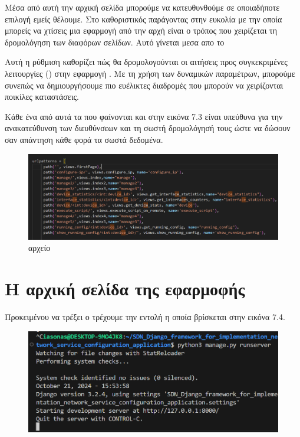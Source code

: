\FloatBarrier

Μέσα από αυτή την αρχική σελίδα μπορούμε να κατευθυνθούμε σε οποιαδήποτε επιλογή εμείς θέλουμε.
Στο  καθοριστικός παράγοντας στην ευκολία με την οποία
μπορείς να χτίσεις μια εφαρμογή από την αρχή είναι ο τρόπος που χειρίζεται
τη δρομολόγηση των διαφόρων σελίδων. Αυτό γίνεται μεσα απο το 

Αυτή η ρύθμιση καθορίζει πώς θα δρομολογούνται οι 
αιτήσεις  προς συγκεκριμένες λειτουργίες () 
στην εφαρμογή . Με τη χρήση των δυναμικών παραμέτρων, 
μπορούμε συνεπώς να δημιουργήσουμε πιο ευέλικτες διαδρομές  
που μπορούν να χειρίζονται ποικίλες καταστάσεις. 

Κάθε ένα από αυτά τα  που φαίνονται και στην εικόνα 7.3
είναι υπεύθυνα για την ανακατεύθυνση των διευθύνσεων και τη σωστή δρομολόγησή
τους ώστε να δώσουν σαν απάντηση κάθε φορά τα σωστά δεδομένα.

\FloatBarrier
\begin{figure}[h]
	\centering
	\includegraphics[width=1.0\textwidth]{graphics/urls.png}
	\caption{  αρχείο}
\end{figure}

\FloatBarrier



\section{Η αρχική σελίδα της εφαρμοφής}

Προκειμένου να τρέξει ο 
τρέχουμε την εντολή η οποία βρίσκεται στην 
εικόνα 7.4.

\FloatBarrier

\begin{figure}[h]
	\centering
	\includegraphics[width=1.0\textwidth]{graphics/django_server_run.png}
	\caption{ }
\end{figure}


